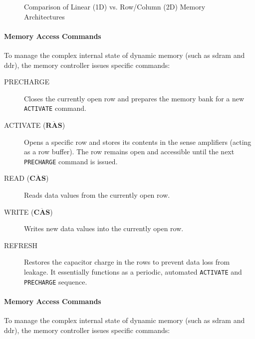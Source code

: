 \begin{figure}[htbp]
    \caption{Comparison of Linear (1D) vs. Row/Column (2D) Memory Architectures}
    \label{fig:memory-org}
\end{figure}

\paragraph{Memory Access Commands}
To manage the complex internal state of dynamic memory (such as \gls{sdram} and \gls{ddr}), the memory controller issues specific commands:

\begin{description}
    \item[PRECHARGE] Closes the currently open row and prepares the memory bank for a new \texttt{ACTIVATE} command.
    \item[ACTIVATE (\(\overline{\textbf{RAS}}\))] Opens a specific row and stores its contents in the sense amplifiers (acting as a row buffer). The row remains open and accessible until the next \texttt{PRECHARGE} command is issued.
    \item[READ (\(\overline{\textbf{CAS}}\))] Reads data values from the currently open row.
    \item[WRITE (\(\overline{\textbf{CAS}}\))] Writes new data values into the currently open row.
    \item[REFRESH] Restores the capacitor charge in the rows to prevent data loss from leakage. It essentially functions as a periodic, automated \texttt{ACTIVATE} and \texttt{PRECHARGE} sequence.
\end{description}

\paragraph{Memory Access Commands}
To manage the complex internal state of dynamic memory (such as \gls{sdram} and \gls{ddr}), the memory controller issues specific commands:

